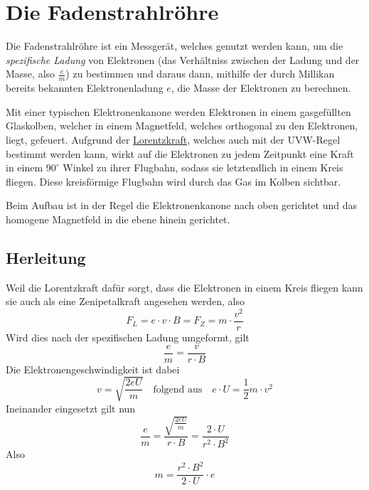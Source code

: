 \documentclass{article}
\begin{document}
\section{Die Fadenstrahlröhre} 
Die Fadenstrahlröhre ist ein Messgerät, welches genutzt werden kann, um die \emph{spezifische Ladung} von Elektronen (das Verhältniss zwischen der Ladung und der Masse, also $\frac{e}{m}$) zu bestimmen und daraus dann, mithilfe der durch Millikan bereits bekannten Elektronenladung $e$, die Masse der Elektronen zu berechnen.
 
Mit einer typischen Elektronenkanone werden Elektronen in einem gasgefüllten Glaskolben, welcher in einem Magnetfeld, welches orthogonal zu den Elektronen, liegt, gefeuert. Aufgrund der \hyperref[Lorentzkraft]{Lorentzkraft}, welches auch mit der UVW-Regel bestimmt werden kann, wirkt auf die Elektronen zu jedem Zeitpunkt eine Kraft in einem $90^\circ$ Winkel zu ihrer Flugbahn, sodass sie letztendlich in einem Kreis fliegen. Diese kreisförmige Flugbahn wird durch das Gas im Kolben sichtbar.
 
Beim Aufbau ist in der Regel die Elektronenkanone nach oben gerichtet und das homogene Magnetfeld in die ebene hinein gerichtet.
 
\subsection{Herleitung}%
Weil die Lorentzkraft dafür sorgt, dass die Elektronen in einem Kreis fliegen kann sie auch als eine Zenipetalkraft angesehen werden, also
\[
 F_L = e \cdot v \cdot B = F_Z = m \cdot \dfrac{v^2}{r}
\]
Wird dies nach der spezifischen Ladung umgeformt, gilt
\[
 \frac{e}{m} = \frac{v}{r \cdot B} 
\]
Die Elektronengeschwindigkeit ist dabei
\[
 v = \sqrt{\frac{2eU}{m}}
 \quad \text{folgend aus} \quad
 e \cdot U = \frac{1}{2} m \cdot v^2 
\]
Ineinander eingesetzt gilt nun
\[
 \frac{e}{m} = \frac{\sqrt{\frac{2eU}{m}}}{r \cdot B} = \frac{2 \cdot U}{r^2 \cdot B^2}
\]
Also
\[
 m = \frac{r^2 \cdot B^2}{2 \cdot U} \cdot e
\] 
\end{document}
